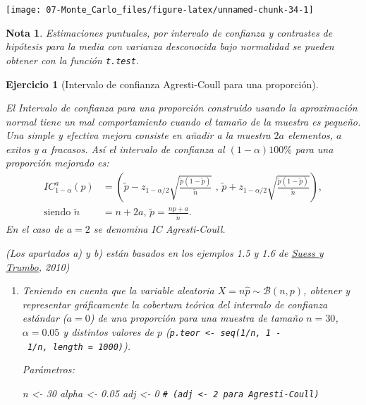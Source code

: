 \documentclass[
  10pt,
]{book}
\newenvironment{Shaded}{\begin{snugshade}}{\end{snugshade}}
\newcommand{\CommentTok}[1]{\textcolor[rgb]{0.56,0.35,0.01}{\textit{#1}}}
\newcommand{\DecValTok}[1]{\textcolor[rgb]{0.00,0.00,0.81}{#1}}
\newcommand{\FloatTok}[1]{\textcolor[rgb]{0.00,0.00,0.81}{#1}}
\newcommand{\NormalTok}[1]{#1}
\newcommand{\OtherTok}[1]{\textcolor[rgb]{0.56,0.35,0.01}{#1}}
\theoremstyle{break}
\newtheorem{exercise}{Ejercicio}[chapter]
\theoremstyle{nonumberplain}
\newtheorem{remark}{Nota}
\renewcommand{\CommentTok}[1]{\textcolor[rgb]{0.41,0.41,0.41}{\texttt{#1}}}
\begin{document}
\begin{center}\texttt{[image: 07-Monte\_Carlo\_files/figure-latex/unnamed-chunk-34-1]} \end{center}

\begin{remark}
Estimaciones puntuales, por intervalo de confianza y contrastes de hipótesis
para la media con varianza desconocida bajo normalidad
se pueden obtener con la función \texttt{t.test}.
\end{remark}

\vspace{0.5cm}

\begin{exercise}[Intervalo de confianza Agresti-Coull para una proporción]
\protect\hypertarget{exr:ic-agresti-coull}{}\label{exr:ic-agresti-coull}

El Intervalo de confianza para una proporción construido usando la
aproximación normal tiene un mal comportamiento cuando el tamaño de
la muestra es pequeño. Una simple y efectiva mejora consiste en
añadir a la muestra \(2a\) elementos, \(a\) exitos y \(a\) fracasos. Así
el intervalo de confianza al \(\left( 1-\alpha\right) 100\%\) para
una proporción mejorado es:
\[\begin{aligned}
IC_{1-\alpha}^{a}\left(  p\right)   
& =\left(  \tilde{p}-z_{1-\alpha/2}\sqrt{\frac{\tilde{p}(1-\tilde{p})}{\tilde{n}}} \text{ , }
\tilde{p}+z_{1-\alpha/2}\sqrt{\frac{\tilde{p}(1-\tilde{p})}{\tilde{n}}}\right)  ,\\
\text{siendo }\tilde{n} & = n+2a \text{, } \tilde{p} = \frac{np+a}{\tilde{n}}.
\end{aligned}\]
En el caso de \(a=2\) se denomina IC Agresti-Coull.

(Los apartados a) y b) están basados en los ejemplos 1.5 y 1.6 de \href{http://www.springer.com/gp/book/9780387402734}{Suess y Trumbo}, 2010)

\begin{enumerate}
\def\labelenumi{\alph{enumi})}
\item
  Teniendo en cuenta que la variable aleatoria \(X=n\hat{p}\sim\mathcal{B}(n,p)\),
  obtener y representar gráficamente la cobertura teórica del
  intervalo de confianza estándar (\(a=0\)) de una proporción para
  una muestra de tamaño \(n=30\), \(\alpha=0.05\) y distintos valores
  de \(p\) (\texttt{p.teor\ \textless{}-\ seq(1/n,\ 1\ -\ 1/n,\ length\ =\ 1000)}).

  Parámetros:

\begin{Shaded}
\begin{Highlighting}[]
\NormalTok{n }\OtherTok{\textless{}{-}} \DecValTok{30}
\NormalTok{alpha }\OtherTok{\textless{}{-}} \FloatTok{0.05}
\NormalTok{adj }\OtherTok{\textless{}{-}} \DecValTok{0}  \CommentTok{\# (adj \textless{}{-} 2 para Agresti{-}Coull)}
\end{Highlighting}
\end{Shaded}


\end{enumerate}
\end{exercise}
\end{document}
